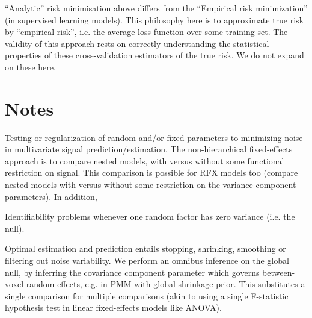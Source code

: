\documentclass{article}
\begin{document}
{{``Analytic'' risk minimisation above differs from the ``Empirical risk minimization'' (in supervised learning models). This philosophy here is to approximate true risk by ``empirical risk'', i.e. the average loss function over some training set. The validity of this approach rests on correctly understanding the statistical properties of these cross-validation estimators of the true risk. We do not expand on these here.

}
}



\section{Notes}



Testing or regularization of random and/or fixed parameters to minimizing noise in multivariate signal prediction/estimation. The non-hierarchical fixed-effects approach is to compare nested models, with versus without some functional restriction on signal. This comparison is possible for RFX models too (compare nested models with versus without some restriction on the variance component parameters). In addition, 

Identifiability problems whenever one random factor has zero variance (i.e. the null).

Optimal estimation and prediction entails stopping, shrinking, smoothing or filtering out noise variability. We perform an omnibus inference on the global null, by inferring the covariance component parameter which governs between-voxel random effects, e.g. in PMM with global-shrinkage prior. This substitutes a single comparison for multiple comparisons (akin to using a single F-statistic hypothesis test in linear fixed-effects models like ANOVA).
\end{document}
